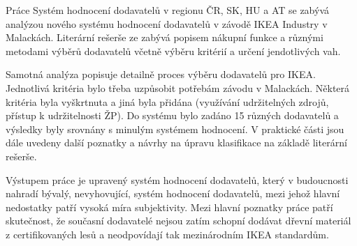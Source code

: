 \documentclass[oneside,12pt]{article}%
\begin{document}
Pr\'{a}ce Syst\'{e}m hodnocen\'{i} dodavatel\r{u} v regionu \v{C}R, SK, HU a AT se zab\'{y}v\'{a} anal\'{y}zou nov\'{e}ho syst\'{e}mu hodnocen\'{i} dodavatel\r{u} v z\'{a}vod\v{e} IKEA Industry v Malack\'{a}ch. Liter\'{a}rn\'{i} re\v{s}er\v{s}e ze zab\'{y}v\'{a} popisem n\'{a}kupn\'{i} funkce a r\r{u}zn\'{y}mi metodami v\'{y}b\v{e}r\r{u} dodavatel\r{u} v\v{c}etn\v{e} v\'{y}b\v{e}ru krit\'{e}ri\'{i} a ur\v{c}en\'{i} jendotliv\'{y}ch vah. \par
Samotn\'{a} anal\'{y}za popisuje detailn\v{e} proces v\'{y}b\v{e}ru dodavatel\r{u} pro IKEA. Jednotliv\'{a} krit\'{e}ria bylo t\v{r}eba uzp\r{u}sobit pot\v{r}eb\'{a}m z\'{a}vodu v Malack\'{a}ch. N\v{e}kter\'{a} krit\'{e}ria byla vy\v{s}krtnuta a jin\'{a} byla p\v{r}id\'{a}na (vyu\v{z}\'{i}v\'{a}n\'{i} udr\v{z}iteln\'{y}ch zdroj\r{u}, p\v{r}\'{i}stup k udr\v{z}itelnosti \v{Z}P). Do syst\'{e}mu bylo zad\'{a}no 15 r\r{u}zn\'{y}ch dodavatelů a v\'{y}sledky byly srovn\'{a}ny s minul\'{y}m syst\'{e}mem hodnocen\'{i}. V praktick\'{e} \v{c}\'{a}sti jsou d\'{a}le uvedeny dal\v{s}\'{i} poznatky a n\'{a}vrhy na \'{u}pravu klasifikace na z\'{a}klad\v{e} liter\'{a}rn\'{i} re\v{s}er\v{s}e. \par
V\'{y}stupem pr\'{a}ce je upraven\'{y} syst\'{e}m hodnocen\'{i} dodavatel\r{u}, kter\'{y} v budoucnosti nahrad\'{i} b\'{y}val\'{y}, nevyhovuj\'{i}c\'{i}, syst\'{e}m hodnocen\'{i} dodavatel\r{u}, mezi jeho\v{z} hlavn\'{i} nedostatky pat\v{r}\'{i} vysok\'{a} m\'{i}ra subjektivity. Mezi hlavn\'{i} poznatky pr\'{a}ce pat\v{r}\'{i} skute\v{c}nost, \v{z}e sou\v{c}asn\'{i} dodavatel\'{e} nejsou zat\'{i}m schopn\'{i} dod\'{a}vat d\v{r}evn\'{i} materi\'{a}l z certifikovan\'{y}ch les\r{u} a neodpov\'{i}daj\'{i} tak mezin\'{a}rodn\'{i}m IKEA standard\r{u}m.
\end{document}
